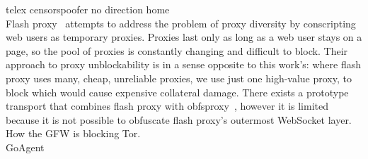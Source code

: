 \documentclass{article}
\begin{document}
telex censorspoofer no direction home\\

Flash proxy~\cite{flashproxy-pets12} attempts to address the problem of proxy
diversity by conscripting web users as temporary proxies. Proxies last only as
long as a web user stays on a page, so the pool of proxies is constantly
changing and difficult to block. Their approach to proxy unblockability is in a
sense opposite to this work's: where flash proxy uses many, cheap, unreliable
proxies, we use just one high-value proxy, to block which would cause expensive
collateral damage. There exists a prototype transport that combines flash proxy
with obfsproxy~\cite{obfs-flash}, however it is limited because it is not
possible to obfuscate flash proxy's outermost WebSocket layer.\\

How the GFW is blocking Tor. \cite{foci12-winter}\\

GoAgent\\


 

\end{document}
